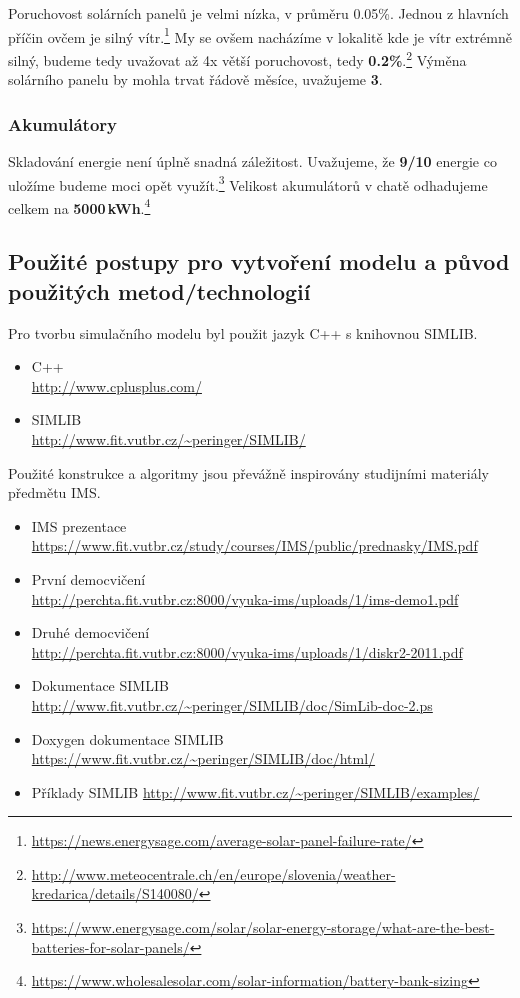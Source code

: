 Poruchovost solárních panelů je velmi nízka, v průměru 0.05\%. Jednou z hlavních příčin ovčem je silný vítr.\footnote{\url{https://news.energysage.com/average-solar-panel-failure-rate/}} My se ovšem nacházíme v lokalitě kde je vítr extrémně silný, budeme tedy uvažovat až 4x větší poruchovost, tedy \textbf{0.2\%}.\footnote{\url{http://www.meteocentrale.ch/en/europe/slovenia/weather-kredarica/details/S140080/}} Výměna solárního panelu by mohla trvat řádově měsíce, uvažujeme \textbf{3}.



\subsubsection{Akumulátory}

Skladování energie není úplně snadná záležitost. Uvažujeme, že \textbf{9/10} energie co uložíme budeme moci opět využít.\footnote{\url{https://www.energysage.com/solar/solar-energy-storage/what-are-the-best-batteries-for-solar-panels/}} Velikost akumulátorů v chatě odhadujeme celkem na \textbf{5000\,kWh}.\footnote{\url{https://www.wholesalesolar.com/solar-information/battery-bank-sizing}}



\subsection{Použité postupy pro vytvoření modelu a původ použitých metod/technologií}

Pro tvorbu simulačního modelu byl použit jazyk C++ s knihovnou SIMLIB.
\begin{itemize}
    \item C++\\
    \url{http://www.cplusplus.com/}
    \item SIMLIB\\
    \url{http://www.fit.vutbr.cz/~peringer/SIMLIB/}
\end{itemize}

Použité konstrukce a algoritmy jsou převážně inspirovány studijními materiály předmětu IMS.
\begin{itemize}
    \item IMS prezentace\\
    \url{https://www.fit.vutbr.cz/study/courses/IMS/public/prednasky/IMS.pdf}
    \item První democvičení\\
    \url{http://perchta.fit.vutbr.cz:8000/vyuka-ims/uploads/1/ims-demo1.pdf}
    \item Druhé democvičení\\
    \url{http://perchta.fit.vutbr.cz:8000/vyuka-ims/uploads/1/diskr2-2011.pdf}
    \item Dokumentace SIMLIB\\
    \url{http://www.fit.vutbr.cz/~peringer/SIMLIB/doc/SimLib-doc-2.ps}
    \item Doxygen dokumentace SIMLIB\\
    \url{https://www.fit.vutbr.cz/~peringer/SIMLIB/doc/html/}
    \item Příklady SIMLIB
    \url{http://www.fit.vutbr.cz/~peringer/SIMLIB/examples/}
\end{itemize}
